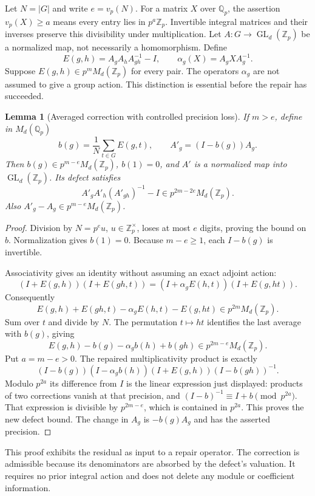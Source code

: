 \documentclass[11pt]{article}
\newtheorem{lemma}[theorem]{Lemma}
\theoremstyle{definition}
\theoremstyle{remark}
\begin{document}
Let $N=|G|$ and write $e=v_p(N)$. For a matrix $X$ over $\mathbb Q_p$, the assertion $v_p(X)\geq a$ means every entry lies in $p^a\mathbb Z_p$. Invertible integral matrices and their inverses preserve this divisibility under multiplication. Let $A:G\to\operatorname{GL}_d(\mathbb Z_p)$ be a normalized map, not necessarily a homomorphism. Define
\[
 E(g,h)=A_gA_hA_{gh}^{-1}-I,
 \qquad \alpha_g(X)=A_gXA_g^{-1}.
\]
Suppose $E(g,h)\in p^mM_d(\mathbb Z_p)$ for every pair. The operators $\alpha_g$ are not assumed to give a group action. This distinction is essential before the repair has succeeded.

\begin{lemma}[Averaged correction with controlled precision loss]\label{lem:quadratic-repair}
If $m>e$, define in $M_d(\mathbb Q_p)$
\[
 b(g)=\frac1N\sum_{t\in G}E(g,t),\qquad
 A'_g=(I-b(g))A_g.
\]
Then $b(g)\in p^{m-e}M_d(\mathbb Z_p)$, $b(1)=0$, and $A'$ is a normalized map into $\operatorname{GL}_d(\mathbb Z_p)$. Its defect satisfies
\[
 \boxed{A'_gA'_h(A'_{gh})^{-1}-I\in
 p^{2m-2e}M_d(\mathbb Z_p).}
\]
Also $A'_g-A_g\in p^{m-e}M_d(\mathbb Z_p)$.
\end{lemma}
\begin{proof}
Division by $N=p^eu$, $u\in\mathbb Z_p^\times$, loses at most $e$ digits, proving the bound on $b$. Normalization gives $b(1)=0$. Because $m-e\geq1$, each $I-b(g)$ is invertible.

Associativity gives an identity without assuming an exact adjoint action:
\[
 (I+E(g,h))(I+E(gh,t))
 = (I+\alpha_g E(h,t))(I+E(g,ht)).
\]
Consequently
\[
 E(g,h)+E(gh,t)-\alpha_g E(h,t)-E(g,ht)
 \in p^{2m}M_d(\mathbb Z_p).
\]
Sum over $t$ and divide by $N$. The permutation $t\mapsto ht$ identifies the last average with $b(g)$, giving
\[
 E(g,h)-b(g)-\alpha_g b(h)+b(gh)
 \in p^{2m-e}M_d(\mathbb Z_p).
\]
Put $a=m-e>0$. The repaired multiplicativity product is exactly
\[
 (I-b(g))(I-\alpha_g b(h))(I+E(g,h))(I-b(gh))^{-1}.
\]
Modulo $p^{2a}$ its difference from $I$ is the linear expression just displayed: products of two corrections vanish at that precision, and $(I-b)^{-1}\equiv I+b\pmod{p^{2a}}$. That expression is divisible by $p^{2m-e}$, which is contained in $p^{2a}$. This proves the new defect bound. The change in $A_g$ is $-b(g)A_g$ and has the asserted precision.
\end{proof}

This proof exhibits the residual as input to a repair operator. The correction is admissible because its denominators are absorbed by the defect's valuation. It requires no prior integral action and does not delete any module or coefficient information.
\end{document}
